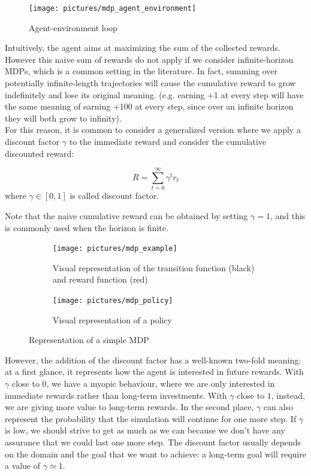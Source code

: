 \begin{figure}[t]
\centering
\texttt{[image: pictures/mdp\_agent\_environment]}
\caption{Agent-environment loop}
\end{figure}

Intuitively, the agent aims at maximizing the sum of the collected rewards. However this naive sum of rewards do not apply if we consider infinite-horizon MDPs, which is a common setting in the literature. In fact, summing over potentially infinite-length trajectories will cause the cumulative reward to grow indefinitely and lose its original meaning. (e.g. earning +1 at every step will have the same meaning of earning +100 at every step, since over an infinite horizon they will both grow to infinity).\\
For this reason, it is common to consider a generalized version where we apply a discount factor $\gamma$ to the immediate reward and consider the cumulative discounted reward:
\begin{definition}
\begin{equation*}
R = \sum_{t=0}^{\infty} \gamma^t r_t
\end{equation*}
where $\gamma \in [0,1]$ is called discount factor. 
\end{definition}
Note that the naive cumulative reward can be obtained by setting $\gamma=1$, and this is commonly used when the horizon is finite. 

\begin{figure}[t]
\centering
\begin{subfigure}[t]{0.495\textwidth}
\texttt{[image: pictures/mdp\_example]}
\caption{Visual representation of the transition function (black) and reward function (red)}
\end{subfigure}
\hfill
\begin{subfigure}[t]{0.495\textwidth}
\texttt{[image: pictures/mdp\_policy]}
\caption{Visual representation of a policy}
\end{subfigure}
\caption{Representation of a simple MDP}
\end{figure}

However, the addition of the discount factor has a well-known two-fold meaning: at a first glance, it represents how the agent is interested in future rewards. With $\gamma$ close to $0$, we have a myopic behaviour, where we are only interested in immediate rewards rather than long-term investments. With $\gamma$ close to $1$, instead, we are giving more value to long-term rewards. In the second place, $\gamma$ can also represent the probability that the simulation will continue for one more step. If $\gamma$ is low, we should strive to get as much as we can because we don't have any assurance that we could last one more step.
The discount factor usually depends on the domain and the goal that we want to achieve: a long-term goal will require a value of $\gamma \simeq 1$.


